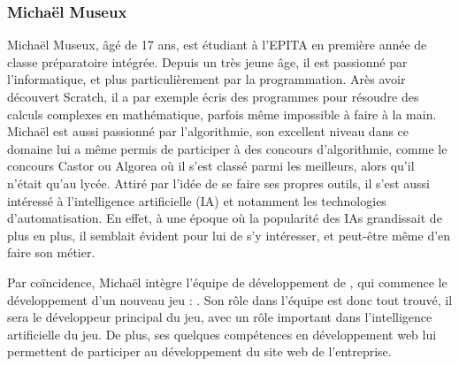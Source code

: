 \subsubsection*{Michaël Museux}

Michaël Museux, âgé de 17 ans, est étudiant à l'EPITA en première année de classe préparatoire intégrée. 
Depuis un très jeune âge, il est passionné par l'informatique, et plus particulièrement par la programmation.
Arès avoir découvert Scratch, il a par exemple écris des programmes pour résoudre des calculs complexes en mathématique, parfois même impossible à faire à la main.
Michaël est aussi passionné par l'algorithmie, son excellent niveau dans ce domaine lui a même permis de participer à des concours d'algorithmie, comme le concours Castor ou Algorea où il s'est classé parmi les meilleurs, alors qu'il n'était qu'au lycée. 
Attiré par l'idée de se faire ses propres outils, il s'est aussi intéressé à l’intelligence artificielle (IA) et notamment les technologies d’automatisation.
En effet, à une époque où la popularité des IAs grandissait de plus en plus, il semblait évident pour lui de s'y intéresser, et peut-être même d'en faire son métier.

Par coïncidence, Michaël intègre l'équipe de développement de \textit{\companyName}, qui commence le développement d'un nouveau jeu : \textit{\gameName}. 
Son rôle dans l'équipe est donc tout trouvé, il sera le développeur principal du jeu, avec un rôle important dans l'intelligence artificielle du jeu.
De plus, ses quelques compétences en développement web lui permettent de participer au développement du site web de l'entreprise.

